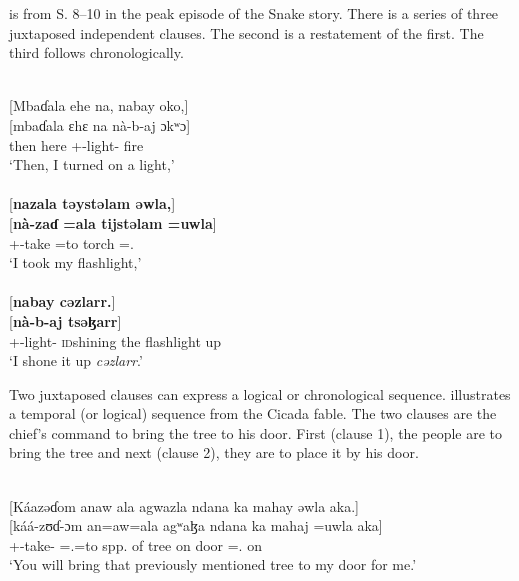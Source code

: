  is from S. 8--10 in the peak episode of the Snake story. There is a series of three juxtaposed independent clauses. The second is a restatement of the first. The third follows chronologically. 

\ea \label{ex:12:65}\\
{}[Mbaɗala  ehe  na,  nabay  oko,] \\
\gll  {}[mbaɗala ɛhɛ na nà-b-aj ɔkʷɔ]\\
      then     here {\PSP}  {\oneS}+{\PFV}-light{}-{\CL}     fire\\
\glt  ‘Then, I turned on a light,’\\

 \medskip{}\\
{}[\textbf{nazala  təystəlam  əwla,}] \\
\gll  {}[\textbf{nà-zaɗ =ala tijstəlam =uwla}]\\
      {\oneS}+{\PFV}-take =to     torch          ={\oneS}.{\POSS}\\
\glt  ‘I took my flashlight,’\\

 \medskip{}\\
{} [\textbf{nabay  cəzlarr.}]\\
\gll  {}[\textbf{nà-b-aj tsəɮarr}]\\
      {\oneS}+{\PFV}-light{}-{\CL}       \textsc{id}shining the flashlight up\\
\glt  ‘I shone it up \textit{cəzlarr}.’
\z 

Two juxtaposed clauses can express a logical or chronological sequence.  illustrates a temporal (or logical) sequence from the Cicada fable. The two clauses are the chief’s command to bring the tree to his door. First (clause 1), the people are to bring the tree and next (clause 2), they are to place it by his door. 

\ea \label{ex:12:66}
\\
{}[Káazəɗom  anaw  ala  agwazla  ndana  ka  mahay  əwla  aka.]\\  
\gll {}[káá-zʊɗ{}-ɔm an=aw=ala  agʷaɮa ndana ka mahaj =uwla aka] \\     
      {\twoP}+{\POT}-take-{\twoP}   {\DAT}={\oneS}.{\IO}=to   {spp. of tree}    {\DEM}      on  door  ={\oneS}.{\POSS}   on \\     
\glt ‘You will bring that previously mentioned tree to my door for me.’\\


